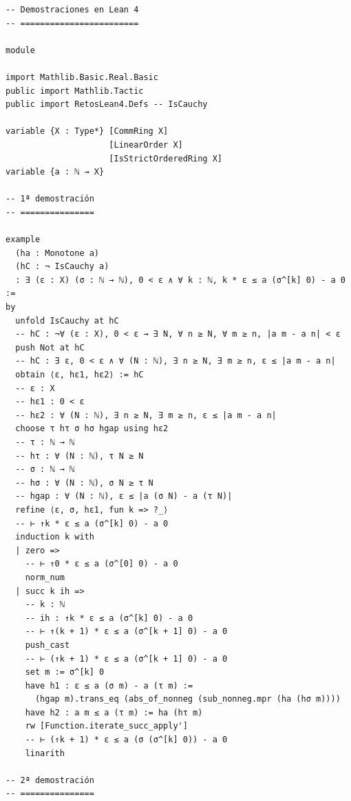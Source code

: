 \begin{verbatim}
-- Demostraciones en Lean 4
-- ========================

module

import Mathlib.Basic.Real.Basic
public import Mathlib.Tactic
public import RetosLean4.Defs -- IsCauchy

variable {X : Type*} [CommRing X]
                     [LinearOrder X]
                     [IsStrictOrderedRing X]
variable {a : ℕ → X}

-- 1ª demostración
-- ===============

example
  (ha : Monotone a)
  (hC : ¬ IsCauchy a)
  : ∃ (ε : X) (σ : ℕ → ℕ), 0 < ε ∧ ∀ k : ℕ, k * ε ≤ a (σ^[k] 0) - a 0 :=
by
  unfold IsCauchy at hC
  -- hC : ¬∀ (ε : X), 0 < ε → ∃ N, ∀ n ≥ N, ∀ m ≥ n, |a m - a n| < ε
  push Not at hC
  -- hC : ∃ ε, 0 < ε ∧ ∀ (N : ℕ), ∃ n ≥ N, ∃ m ≥ n, ε ≤ |a m - a n|
  obtain ⟨ε, hε1, hε2⟩ := hC
  -- ε : X
  -- hε1 : 0 < ε
  -- hε2 : ∀ (N : ℕ), ∃ n ≥ N, ∃ m ≥ n, ε ≤ |a m - a n|
  choose τ hτ σ hσ hgap using hε2
  -- τ : ℕ → ℕ
  -- hτ : ∀ (N : ℕ), τ N ≥ N
  -- σ : ℕ → ℕ
  -- hσ : ∀ (N : ℕ), σ N ≥ τ N
  -- hgap : ∀ (N : ℕ), ε ≤ |a (σ N) - a (τ N)|
  refine ⟨ε, σ, hε1, fun k => ?_⟩
  -- ⊢ ↑k * ε ≤ a (σ^[k] 0) - a 0
  induction k with
  | zero =>
    -- ⊢ ↑0 * ε ≤ a (σ^[0] 0) - a 0
    norm_num
  | succ k ih =>
    -- k : ℕ
    -- ih : ↑k * ε ≤ a (σ^[k] 0) - a 0
    -- ⊢ ↑(k + 1) * ε ≤ a (σ^[k + 1] 0) - a 0
    push_cast
    -- ⊢ (↑k + 1) * ε ≤ a (σ^[k + 1] 0) - a 0
    set m := σ^[k] 0
    have h1 : ε ≤ a (σ m) - a (τ m) :=
      (hgap m).trans_eq (abs_of_nonneg (sub_nonneg.mpr (ha (hσ m))))
    have h2 : a m ≤ a (τ m) := ha (hτ m)
    rw [Function.iterate_succ_apply']
    -- ⊢ (↑k + 1) * ε ≤ a (σ (σ^[k] 0)) - a 0
    linarith

-- 2ª demostración
-- ===============


\end{verbatim}
